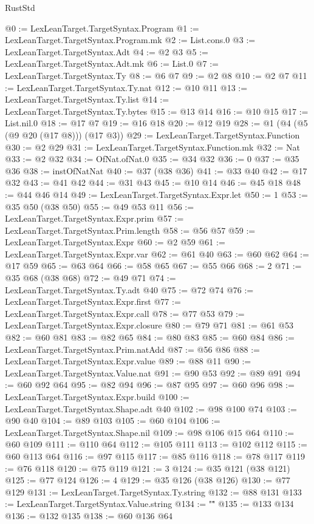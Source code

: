 \begin{lexlean}{RustStd}
\begin{coremodule}
@0 := LexLeanTarget.TargetSyntax.Program
@1 := LexLeanTarget.TargetSyntax.Program.mk
@2 := List.cons.{0}
@3 := LexLeanTarget.TargetSyntax.Adt
@4 := @2 @3
@5 := LexLeanTarget.TargetSyntax.Adt.mk
@6 := List.{0}
@7 := LexLeanTarget.TargetSyntax.Ty
@8 := @6 @7
@9 := @2 @8
@10 := @2 @7
@11 := LexLeanTarget.TargetSyntax.Ty.nat
@12 := @10 @11
@13 := LexLeanTarget.TargetSyntax.Ty.list
@14 := LexLeanTarget.TargetSyntax.Ty.bytes
@15 := @13 @14
@16 := @10 @15
@17 := List.nil.{0}
@18 := @17 @7
@19 := @16 @18
@20 := @12 @19
@28 := @1 (@4 (@5 (@9 @20 (@17 @8))) (@17 @3))
@29 := LexLeanTarget.TargetSyntax.Function
@30 := @2 @29
@31 := LexLeanTarget.TargetSyntax.Function.mk
@32 := Nat
@33 := @2 @32
@34 := OfNat.ofNat.{0}
@35 := @34 @32
@36 := 0
@37 := @35 @36
@38 := instOfNatNat
@40 := @37 (@38 @36)
@41 := @33 @40
@42 := @17 @32
@43 := @41 @42
@44 := @31 @43
@45 := @10 @14
@46 := @45 @18
@48 := @44 @46 @14
@49 := LexLeanTarget.TargetSyntax.Expr.let
@50 := 1
@53 := @35 @50 (@38 @50)
@55 := @49 @53 @11
@56 := LexLeanTarget.TargetSyntax.Expr.prim
@57 := LexLeanTarget.TargetSyntax.Prim.length
@58 := @56 @57
@59 := LexLeanTarget.TargetSyntax.Expr
@60 := @2 @59
@61 := LexLeanTarget.TargetSyntax.Expr.var
@62 := @61 @40
@63 := @60 @62
@64 := @17 @59
@65 := @63 @64
@66 := @58 @65
@67 := @55 @66
@68 := 2
@71 := @35 @68 (@38 @68)
@72 := @49 @71
@74 := LexLeanTarget.TargetSyntax.Ty.adt @40
@75 := @72 @74
@76 := LexLeanTarget.TargetSyntax.Expr.first
@77 := LexLeanTarget.TargetSyntax.Expr.call
@78 := @77 @53
@79 := LexLeanTarget.TargetSyntax.Expr.closure
@80 := @79 @71
@81 := @61 @53
@82 := @60 @81
@83 := @82 @65
@84 := @80 @83
@85 := @60 @84
@86 := LexLeanTarget.TargetSyntax.Prim.natAdd
@87 := @56 @86
@88 := LexLeanTarget.TargetSyntax.Expr.value
@89 := @88 @11
@90 := LexLeanTarget.TargetSyntax.Value.nat
@91 := @90 @53
@92 := @89 @91
@94 := @60 @92 @64
@95 := @82 @94
@96 := @87 @95
@97 := @60 @96
@98 := LexLeanTarget.TargetSyntax.Expr.build
@100 := LexLeanTarget.TargetSyntax.Shape.adt @40
@102 := @98 @100 @74
@103 := @90 @40
@104 := @89 @103
@105 := @60 @104
@106 := LexLeanTarget.TargetSyntax.Shape.nil
@109 := @98 @106 @15 @64
@110 := @60 @109
@111 := @110 @64
@112 := @105 @111
@113 := @102 @112
@115 := @60 @113 @64
@116 := @97 @115
@117 := @85 @116
@118 := @78 @117
@119 := @76 @118
@120 := @75 @119
@121 := 3
@124 := @35 @121 (@38 @121)
@125 := @77 @124
@126 := 4
@129 := @35 @126 (@38 @126)
@130 := @77 @129
@131 := LexLeanTarget.TargetSyntax.Ty.string
@132 := @88 @131
@133 := LexLeanTarget.TargetSyntax.Value.string
@134 := "\""
@135 := @133 @134
@136 := @132 @135
@138 := @60 @136 @64

\end{coremodule}
\end{lexlean}

